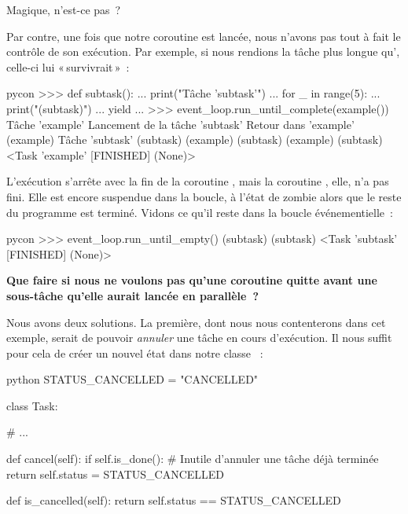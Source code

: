 \documentclass[small]{zmdocument}
\begin{document}
Magique, n’est-ce pas ?



Par contre, une fois que notre coroutine est lancée, nous n’avons pas tout à
fait le contrôle de son exécution. Par exemple, si nous rendions la tâche
 plus longue qu', celle-ci lui « survivrait » :



\begin{CodeBlock}{pycon}
>>> def subtask():
...     print("Tâche 'subtask'")
...     for _ in range(5):
...         print("(subtask)")
...         yield
...
>>> event_loop.run_until_complete(example())
Tâche 'example'
Lancement de la tâche 'subtask'
Retour dans 'example'
(example)
Tâche 'subtask'
(subtask)
(example)
(subtask)
(example)
(subtask)
<Task 'example' [FINISHED] (None)>
\end{CodeBlock}



L’exécution s’arrête avec la fin de la coroutine , mais la coroutine
, elle, n’a pas fini. Elle est encore suspendue dans la boucle, à
l’état de zombie alors que le reste du programme est terminé. Vidons ce qu’il
reste dans la boucle événementielle :



\begin{CodeBlock}{pycon}
>>> event_loop.run_until_empty()
(subtask)
(subtask)
<Task 'subtask' [FINISHED] (None)>
\end{CodeBlock}





\textbf{Que faire si nous ne voulons pas qu’une coroutine quitte avant une
sous-tâche qu’elle aurait lancée en parallèle ?}



Nous avons deux solutions. La première, dont nous nous contenterons dans cet
exemple, serait de pouvoir \textit{annuler} une tâche en cours d’exécution. Il nous
suffit pour cela de créer un nouvel état dans notre classe  :



\begin{CodeBlock}{python}
STATUS_CANCELLED = "CANCELLED"

class Task:

    # ...

    def cancel(self):
        if self.is_done():
            # Inutile d'annuler une tâche déjà terminée
            return
        self.status = STATUS_CANCELLED

    def is_cancelled(self):
        return self.status == STATUS_CANCELLED
\end{CodeBlock}
\end{document}
